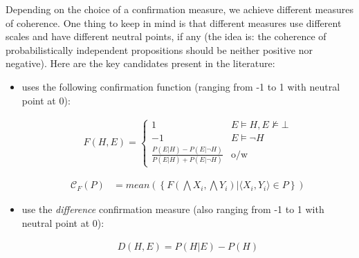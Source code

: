 \documentclass[10pt,]{scrartcl}
\begin{document}
\noindent Depending on the choice of a confirmation measure, we achieve
different measures of coherence.  One thing to keep in mind is
that different measures use different scales and have different neutral points, if any (the idea is: the coherence of probabilistically independent propositions should be neither positive nor
negative). Here are the key candidates present in the literature:

\begin{itemize}

\item \citet{fitelson2003ProbabilisticTheoryCoherence}   uses the following confirmation function (ranging from -1 to 1 with neutral point at 0):

\begin{align*}
    F(H,E) = \begin{cases}
    1 & E\models H, E\not \models \bot \\
    -1 & E \models \neg H\\
    \frac{P(E|H)-P(E|\neg H)}{P(E|H)+P(E|\neg H)} & \mbox{o/w}
    \end{cases}
\end{align*}

\begin{align}
\tag{Fitelson}  
    \mathcal{C}_{F}(P) & =
mean\left(\left\{F(\bigwedge X_i, \bigwedge Y_i) | \langle X_i, Y_i\rangle \in P\right\} \right)
\end{align}






\item  \citet{Douven2007measuring}  use the \textit{difference} confirmation measure (also ranging from -1 to 1 with neutral point at 0):

\begin{align*}
    D(H,E) = P(H|E) - P(H)
\end{align*}


\end{itemize}
\end{document}
